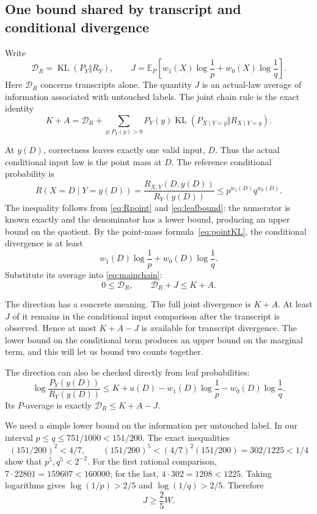 \documentclass[11pt]{article}
\theoremstyle{definition}
\theoremstyle{remark}
\newcommand{\E}{\mathbb E}
\newcommand{\KL}{\operatorname{KL}}
\numberwithin{equation}{section}
\begin{document}
\subsection{One bound shared by transcript and conditional divergence}

Write
\[
 \mathcal D_R=\KL(P_Y\Vert R_Y),\qquad
 J=\E_P\left[w_1(X)\log\frac1p+w_0(X)\log\frac1q\right].
\]
Here \(\mathcal D_R\) concerns transcripts alone. The quantity \(J\)
is an actual-law average of information associated with untouched
labels. The joint chain rule is the exact identity
\begin{equation}\label{eq:mainchain}
 K+A=\mathcal D_R+
 \sum_{y:P_Y(y)>0}P_Y(y)
       \KL(P_{X\mid Y=y}\Vert R_{X\mid Y=y}).
\end{equation}

At \(y(D)\), correctness leaves exactly one valid input, \(D\).
Thus the actual conditional input law is the point mass at \(D\).
The reference conditional probability is
\[
 R(X=D\mid Y=y(D))
 =\frac{R_{X,Y}(D,y(D))}{R_Y(y(D))}
 \le p^{w_1(D)}q^{w_0(D)}.
\]
The inequality follows from \eqref{eq:Rpoint} and \eqref{eq:leafbound}:
the numerator is known exactly and the denominator has a lower
bound, producing an upper bound on the quotient. By the point-mass
formula~\eqref{eq:pointKL}, the conditional divergence is at least
\[
 w_1(D)\log\frac1p+w_0(D)\log\frac1q.
\]
Substitute its average into \eqref{eq:mainchain}:
\begin{equation}\label{eq:shared}
 0\le\mathcal D_R,\qquad \boxed{\mathcal D_R+J\le K+A.}
\end{equation}

The direction has a concrete meaning. The full joint divergence is
\(K+A\). At least \(J\) of it remains in the conditional input
comparison after the transcript is observed. Hence at most
\(K+A-J\) is available for transcript divergence. The lower bound
on the conditional term produces an upper bound on the marginal
term, and this will let us bound two counts together.

The direction can also be checked directly from leaf probabilities:
\[
 \log\frac{P_Y(y(D))}{R_Y(y(D))}
 \le K+a(D)-w_1(D)\log\frac1p-w_0(D)\log\frac1q.
\]
Its \(P\)-average is exactly \(\mathcal D_R\le K+A-J\).

We need a simple lower bound on the information per untouched label.
In our interval \(p\le q\le751/1000<151/200\).
The exact inequalities
\[
 (151/200)^2<4/7,\qquad
 (151/200)^5<(4/7)^2(151/200)=302/1225<1/4
\]
show that \(p^5,q^5<2^{-2}\).
For the first rational comparison, \(7\cdot22801=159607<160000\);
for the last, \(4\cdot302=1208<1225\).
Taking logarithms gives \(\log(1/p)>2/5\) and \(\log(1/q)>2/5\).
Therefore
\begin{equation}\label{eq:J}
 J\ge\frac25 W.
\end{equation}
\end{document}
